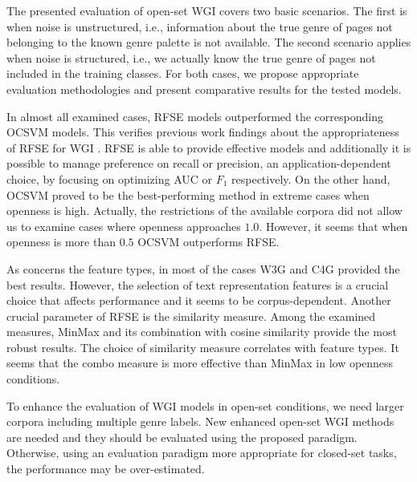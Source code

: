 The presented evaluation of open-set WGI covers two basic scenarios. The first is when noise is unstructured, i.e., information about the true genre of pages not belonging to the known genre palette is not available. The second scenario applies when noise is structured, i.e., we actually know the true genre of pages not included in the training classes. For both cases, we propose appropriate evaluation methodologies and present comparative results for the tested models.

In almost all examined cases, RFSE models outperformed the corresponding OCSVM models. This verifies previous work findings about the appropriateness of RFSE for WGI \citep{pritsos2013open}. RFSE is able to provide effective models and additionally it is possible to manage preference on recall or precision, an application-dependent choice, by focusing on optimizing AUC or $F_1$ respectively. On the other hand, OCSVM proved to be the best-performing method in extreme cases when openness is high. Actually, the restrictions of the available corpora did not allow us to examine cases where openness approaches $1.0$. However, it seems that when openness is more than $0.5$ OCSVM outperforms RFSE.

As concerns the feature types, in most of the cases W3G and C4G provided the best results. However, the selection of text representation features is a crucial choice that affects performance and it seems to be corpus-dependent. Another crucial parameter of RFSE is the similarity measure. Among the examined measures, MinMax and its combination with cosine similarity provide the most robust results. The choice of similarity measure correlates with feature types. It seems that the combo measure is more effective than MinMax in low openness conditions.

To enhance the evaluation of WGI models in open-set conditions, we need larger corpora including multiple genre labels. New enhanced open-set WGI methods are needed and they should be evaluated using the proposed paradigm. Otherwise, using an evaluation paradigm more appropriate for closed-set tasks, the performance may be over-estimated.